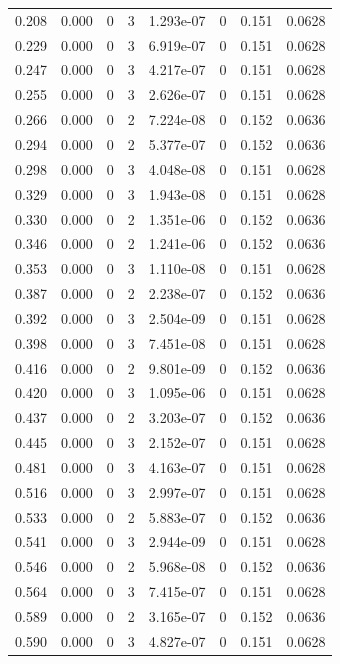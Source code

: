 \documentclass[preview]{standalone}
\begin{document}
{{\begin{tabular}{L{1.2cm}C{1.2cm} C{0.3cm}C{0.5cm} C{1.4cm}C{1.4cm} C{1.4cm}C{1.4cm}}
  0.208  &  0.000  & 0     &  3 &  1.293e-07  & 0  & 0.151 &  0.0628   \\ 
  0.229  &  0.000  & 0     &  3 &  6.919e-07  & 0  & 0.151 &  0.0628   \\ 
  0.247  &  0.000  & 0     &  3 &  4.217e-07  & 0  & 0.151 &  0.0628   \\ 
  0.255  &  0.000  & 0     &  3 &  2.626e-07  & 0  & 0.151 &  0.0628   \\ 
  0.266  &  0.000  & 0     &  2 &  7.224e-08  & 0  & 0.152 &  0.0636   \\ 
  0.294  &  0.000  & 0     &  2 &  5.377e-07  & 0  & 0.152 &  0.0636   \\ 
  0.298  &  0.000  & 0     &  3 &  4.048e-08  & 0  & 0.151 &  0.0628   \\ 
  0.329  &  0.000  & 0     &  3 &  1.943e-08  & 0  & 0.151 &  0.0628   \\ 
  0.330  &  0.000  & 0     &  2 &  1.351e-06  & 0  & 0.152 &  0.0636   \\ 
  0.346  &  0.000  & 0     &  2 &  1.241e-06  & 0  & 0.152 &  0.0636   \\ 
  0.353  &  0.000  & 0     &  3 &  1.110e-08  & 0  & 0.151 &  0.0628   \\ 
  0.387  &  0.000  & 0     &  2 &  2.238e-07  & 0  & 0.152 &  0.0636   \\ 
  0.392  &  0.000  & 0     &  3 &  2.504e-09  & 0  & 0.151 &  0.0628   \\ 
  0.398  &  0.000  & 0     &  3 &  7.451e-08  & 0  & 0.151 &  0.0628   \\ 
  0.416  &  0.000  & 0     &  2 &  9.801e-09  & 0  & 0.152 &  0.0636   \\ 
  0.420  &  0.000  & 0     &  3 &  1.095e-06  & 0  & 0.151 &  0.0628   \\ 
  0.437  &  0.000  & 0     &  2 &  3.203e-07  & 0  & 0.152 &  0.0636   \\ 
  0.445  &  0.000  & 0     &  3 &  2.152e-07  & 0  & 0.151 &  0.0628   \\ 
  0.481  &  0.000  & 0     &  3 &  4.163e-07  & 0  & 0.151 &  0.0628   \\ 
  0.516  &  0.000  & 0     &  3 &  2.997e-07  & 0  & 0.151 &  0.0628   \\ 
  0.533  &  0.000  & 0     &  2 &  5.883e-07  & 0  & 0.152 &  0.0636   \\ 
  0.541  &  0.000  & 0     &  3 &  2.944e-09  & 0  & 0.151 &  0.0628   \\ 
  0.546  &  0.000  & 0     &  2 &  5.968e-08  & 0  & 0.152 &  0.0636   \\ 
  0.564  &  0.000  & 0     &  3 &  7.415e-07  & 0  & 0.151 &  0.0628   \\ 
  0.589  &  0.000  & 0     &  2 &  3.165e-07  & 0  & 0.152 &  0.0636   \\ 
  0.590  &  0.000  & 0     &  3 &  4.827e-07  & 0  & 0.151 &  0.0628   \\ 
\hline 
\end{tabular} 

}}
\end{document}
